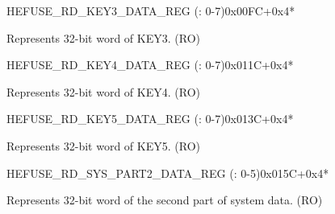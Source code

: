 \begin{register}{H}{EFUSE\_RD\_KEY3\_DATA\_REG (: 0-7)}{0x00FC+0x4*}\label{regdesc:EFUSERDKEY3DATANREG}
%
\regnewline%
\begin{regdesc}\begin{reglist}
\label{fielddesc:EFUSEKEY3DATAN}\item [EFUSE\_KEY3\_DATA\regindex{n}] Represents 32-bit word  of KEY3. (RO)
\end{reglist}\end{regdesc}
\end{register}


\begin{register}{H}{EFUSE\_RD\_KEY4\_DATA\_REG (: 0-7)}{0x011C+0x4*}\label{regdesc:EFUSERDKEY4DATANREG}
%
\regnewline%
\begin{regdesc}\begin{reglist}
\label{fielddesc:EFUSEKEY4DATAN}\item [EFUSE\_KEY4\_DATA\regindex{n}] Represents 32-bit word  of KEY4. (RO)
\end{reglist}\end{regdesc}
\end{register}


\begin{register}{H}{EFUSE\_RD\_KEY5\_DATA\_REG (: 0-7)}{0x013C+0x4*}\label{regdesc:EFUSERDKEY5DATANREG}
%
\regnewline%
\begin{regdesc}\begin{reglist}
\label{fielddesc:EFUSEKEY5DATAN}\item [EFUSE\_KEY5\_DATA\regindex{n}] Represents 32-bit word  of KEY5. (RO)
\end{reglist}\end{regdesc}
\end{register}


\begin{register}{H}{EFUSE\_RD\_SYS\_PART2\_DATA\_REG (: 0-5)}{0x015C+0x4*}\label{regdesc:EFUSERDSYSPART2DATANREG}
%
\regnewline%
\begin{regdesc}\begin{reglist}
\label{fielddesc:EFUSESYSDATAPART2N}\item [EFUSE\_SYS\_DATA\_PART2\_\regindex{n}] Represents 32-bit word  of the second part of system data. (RO)
\end{reglist}\end{regdesc}
\end{register}


